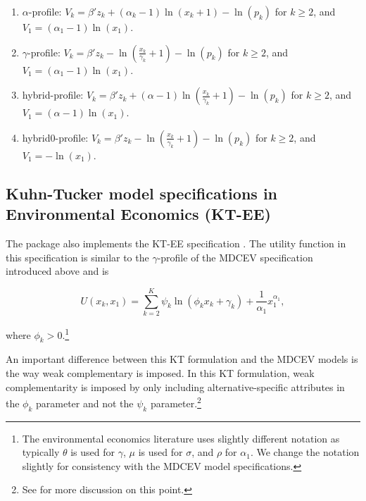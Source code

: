 \begin{enumerate}
\def\labelenumi{\arabic{enumi}.}
\item
  \(\alpha\)-profile:
  \(V_k = \beta' z_k + (\alpha_k-1)\ln\left( x_k + 1 \right) - \ln \left(p_k\right)\)
  for \(k \geq 2\), and \(V_1 = (\alpha_1-1)\ln(x_1)\).
\item
  \(\gamma\)-profile:
  \(V_k = \beta' z_k - \ln\left( \frac{x_k}{\gamma_k} + 1 \right) - \ln \left(p_k\right)\)
  for \(k \geq 2\), and \(V_1 = (\alpha_1-1)\ln(x_1)\).
\item
  hybrid-profile:
  \(V_k = \beta' z_k + (\alpha-1)\ln\left( \frac{x_k}{\gamma_k} + 1 \right) - \ln \left(p_k\right)\)
  for \(k \geq 2\), and \(V_1 = (\alpha-1)\ln(x_1)\).
\item
  hybrid0-profile:
  \(V_k = \beta' z_k - \ln\left( \frac{x_k}{\gamma_k} + 1 \right) - \ln \left(p_k\right)\)
  for \(k \geq 2\), and \(V_1 = -\ln(x_1)\).
\end{enumerate}

\hypertarget{kuhn-tucker-model-specifications-in-environmental-economics-kt-ee}{%
\subsection{Kuhn-Tucker model specifications in Environmental Economics
(KT-EE)}\label{kuhn-tucker-model-specifications-in-environmental-economics-kt-ee}}

The  package also implements the KT-EE specification
\citep{vonhaefenkuhn-tucker2005}. The utility function in this
specification is similar to the \(\gamma\)-profile of the MDCEV
specification introduced above and is

\begin{equation}
U(x_k, x_1) = \sum_{k=2}^{K}\psi_k \ln \left(\phi_kx_k + \gamma_k \right) + \frac{1}{\alpha_1}x_1^{\alpha_1}, 
\label{eq:util_kt_ee}
\end{equation}

\noindent where \(\phi_k >0\).\footnote{The environmental economics
  literature uses slightly different notation as typically \(\theta\) is
  used for \(\gamma\), \(\mu\) is used for \(\sigma\), and \(\rho\) for
  \(\alpha_1\). We change the notation slightly for consistency with the
  MDCEV model specifications.}

An important difference between this KT formulation and the MDCEV models
is the way weak complementary is imposed. In this KT formulation, weak
complementarity is imposed by only including alternative-specific
attributes in the \(\phi_k\) parameter and not the \(\psi_k\)
parameter.\footnote{See \citet{herrigeswhats2004} for more discussion on
  this point.}

